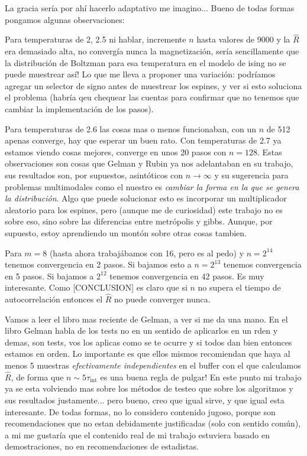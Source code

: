 \documentclass[a4paper, 12pt]{article}
\newcommand{\tauint}{\tau_\text{int}}
\begin{document}
La gracia sería por ahí hacerlo adaptativo me imagino... Bueno de todas formas pongamos algunas observaciones:

Para temperaturas de 2, 2.5 ni hablar, incremente $n$ hasta valores de 9000 y la $\hat{R}$ era demasiado alta, no convergía nunca la magnetización, sería sencillamente que la distribución de Boltzman para esa temperatura en el modelo de ising no se puede muestrear así! Lo que me lleva a proponer una variación: podríamos agregar un selector de signo antes de muestrear los espines, y ver si esto soluciona el problema (habría qeu chequear las cuentas para confirmar que no tenemos que cambiar la implementación de los pasos).

Para temperaturas de 2.6 las cosas mas o menos funcionaban, con un $n$ de 512 apenas converge, hay que esperar un buen rato. Con temperaturas de 2.7 ya estamos viendo cosas mejores, converge en unos 20 pasos con $n = 128$. Estas observaciones son cosas que Gelman y Rubin ya nos adelantaban en su trabajo, sus resultados son, por supuestos, asintóticos con $n \to \infty$ y su sugerencia para problemas multimodales como el nuestro es {\it cambiar la forma en la que se genera la distribución}. Algo que puede solucionar esto es incorporar un multiplicador aleatorio para los espines, pero (aunque me de curiosidad) este trabajo no es sobre eso, sino sobre las diferencias entre metrópolis y gibbs. Aunque, por supuesto, estoy aprendiendo un montón sobre otras cosas tambien.

Para $m = 8$ (hasta ahora trabajábamos con 16, pero es al pedo) y $n = 2^{14}$ tenemos convergencia en 2 pasos. Si bajamos esto a $n = 2^{13}$ tenemos convergencia en 5 pasos. Si bajamos a $2^{12}$ tenemos convergencia en 42 pasos. Es muy interesante. Como [CONCLUSION] es claro que si $n$ no supera el tiempo de autocorrelación entonces el $\hat{R}$ no puede converger nunca.

Vamos a leer el libro mas reciente de Gelman, a ver si me da una mano. En el libro \cite[Capítulo 11]{gelman2013bayesian} Gelman habla de los tests no en un sentido de aplicarlos en un rden y demas, son tests, vos los aplicas como se te ocurre y si todos dan bien entonces estamos en orden. Lo importante es que ellos mismos recomiendan que haya al menos 5 muestras {\it efectivamente independientes} en el buffer con el que calculamos $\hat{R}$, de forma que $n \sim 5\tauint$ es una buena regla de pulgar! En este punto mi trabajo ya se esta volviendo mas sobre los métodos de testeo que sobre los algoritmos y sus resultados justamente... pero bueno, creo que igual sirve, y que igual esta interesante. De todas formas, no lo considero contenido jugoso, porque son recomendaciones que no estan debidamente justificadas (solo con sentido común), a mi me gustaría que el contenido real de mi trabajo estuviera basado en demostraciones, no en recomendaciones de estadistas.
\end{document}
